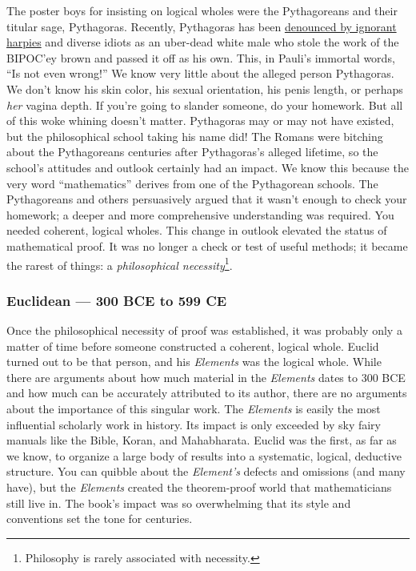 The poster boys for insisting on logical wholes were the Pythagoreans
and their titular sage, Pythagoras. Recently, Pythagoras has been
\href{https://analyzethedatanotthedrivel.org/2022/09/28/on-eponymous-erasure/}{denounced
by ignorant harpies} and diverse idiots as an uber-dead white male who
stole the work of the BIPOC'ey brown and passed it off as his own. This,
in Pauli's immortal words, ``Is not even wrong!'' We know very little
about the alleged person Pythagoras. We don't know his skin color, his
sexual orientation, his penis length, or perhaps \emph{her} vagina
depth. If you're going to slander someone, do your homework. But all of
this woke whining doesn't matter. Pythagoras may or may not have
existed, but the philosophical school taking his name did! The Romans
were bitching about the Pythagoreans centuries after Pythagoras's
alleged lifetime, so the school's attitudes and outlook certainly had an
impact. We know this because the very word ``mathematics'' derives from
one of the Pythagorean schools. The Pythagoreans and others persuasively
argued that it wasn't enough to check your homework; a deeper and more
comprehensive understanding was required. You needed coherent, logical
wholes. This change in outlook elevated the status of mathematical
proof. It was no longer a check or test of useful methods; it became the
rarest of things: a \emph{philosophical
necessity}\footnote{Philosophy is rarely associated with necessity.}.

\subsubsection*{Euclidean --- 300 BCE to 599 CE}%

Once the philosophical necessity of proof was established, it was
probably only a matter of time before someone constructed a coherent,
logical whole. Euclid turned out to be that person, and his
\emph{Elements} was the logical whole. While there are arguments about
how much material in the \emph{Elements} dates to 300 BCE and how much
can be accurately attributed to its author, there are no arguments about
the importance of this singular work. The \emph{Elements} is easily the
most influential scholarly work in history. Its impact is only exceeded
by sky fairy manuals like the Bible, Koran, and Mahabharata. Euclid was
the first, as far as we know, to organize a large body of results into a
systematic, logical, deductive structure. You can quibble about the
\emph{Element's} defects and omissions (and many have), but the
\emph{Elements} created the theorem-proof world that mathematicians
still live in. The book's impact was so overwhelming that its style and
conventions set the tone for centuries.

